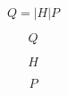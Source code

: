 \documentclass{article}
\begin{document}
\[Q = \left|H \right| P \]
\pagebreak

\[ Q \]
\pagebreak

\[ H \]
\pagebreak

\[ P \]
\pagebreak
\end{document}
